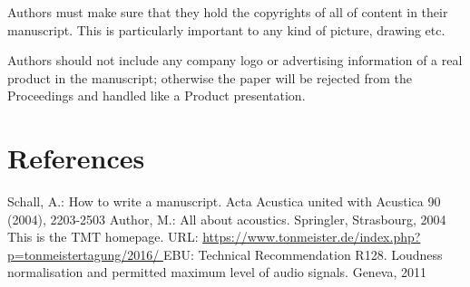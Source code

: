 \documentclass[a4paper, 10pt, twocolumn]{article}
\begin{document}
Authors must make sure that they hold the copyrights of all of content in their manuscript. This is particularly important to any kind of picture, drawing etc.

Authors should not include any company logo or advertising information of a real product in the manuscript; otherwise the paper will be rejected from the Proceedings and handled like a Product presentation. 

\renewcommand\refname{}
\section{References}

\begingroup
\RaggedRight 		%

%
%
\begin{thebibliography}{5}\setlength{\itemsep}{0pt}
\vspace{-8mm}
Schall, A.: How to write a manuscript. Acta Acustica united with Acustica 90 (2004), 2203-2503
%
Author, M.: All about acoustics. Springler, Strasbourg, 2004
%
This is the TMT homepage. %
URL: \textcolor{blue}{\url{https://www.tonmeister.de/index.php?p=tonmeistertagung/2016/ }}
%
EBU: Technical Recommendation R128. Loudness normalisation and permitted maximum level of audio signals. Geneva, 2011 %
%

\end{thebibliography}
\endgroup
\end{document}
